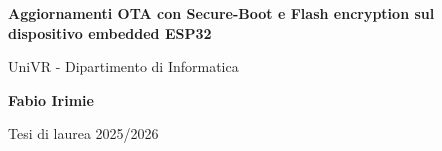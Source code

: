 \begin{titlepage}
	\begin{center}
		\vspace*{1cm}

		\Huge
    \textbf{Aggiornamenti OTA con Secure-Boot e Flash encryption sul dispositivo embedded ESP32}

		\vspace{0.5cm}
		\LARGE
		UniVR - Dipartimento di Informatica

		\vspace{1.5cm}

		\textbf{Fabio Irimie}

		\vfill


		\vspace{0.8cm}


		Tesi di laurea 2025/2026

	\end{center}
\end{titlepage}
